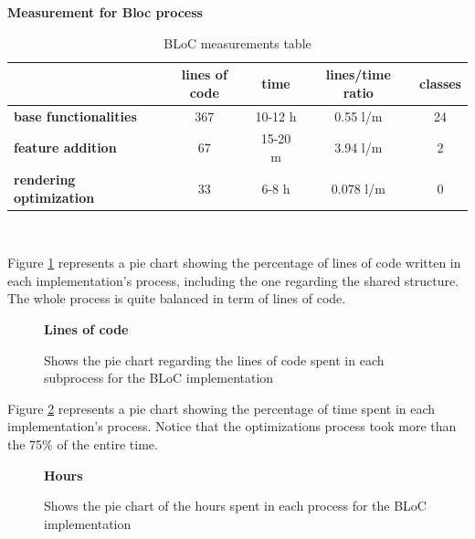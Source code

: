 \begin{table}[H]
    \caption*{\textbf{Measurement for Bloc process}}
    \centering 
    \begin{tabular}{| l | c | c | c | c |}
    \hline
    \rowcolor{bluepoli!40} %
    \hline
     & \textbf{lines of code} & \textbf{time} & \textbf{lines/time ratio} & \textbf{classes} \T\B \\
    \hline
    \textbf{base functionalities} & 367 & 10-12 h & 0.55 l/m & 24 \T\B \\ 
    \textbf{feature addition} & 67 & 15-20 m & 3.94 l/m & 2 \T\B\\ 
    \textbf{rendering optimization} & 33 & 6-8 h & 0.078 l/m & 0
    \T\B\\
    \hline
    \end{tabular}
    \\[10pt]
    \caption{BLoC measurements table}
    \label{table:recap_bloc}
\end{table}

Figure \ref{image:bloc_lines_piechart} represents a pie chart showing the percentage of lines of code written in each implementation's process, including the one regarding the shared structure. The whole process is quite balanced in term of lines of code.

\begin{figure}[H]

\caption*{\textbf{Lines of code}}
\centering
{}
 \caption{Shows the pie chart regarding the lines of code spent in each subprocess for the BLoC implementation}
 \label{image:bloc_lines_piechart}
\end{figure}
Figure \ref{image:bloc_hours_piechart} represents a pie chart showing the percentage of time spent in each implementation's process. Notice that the optimizations process took more than the 75\% of the entire time.

\begin{figure}[H]
 \caption*{\textbf{Hours}}
\centering
{}
 \caption{Shows the pie chart of the hours spent in each process for the BLoC implementation}
 \label{image:bloc_hours_piechart}
\end{figure}

